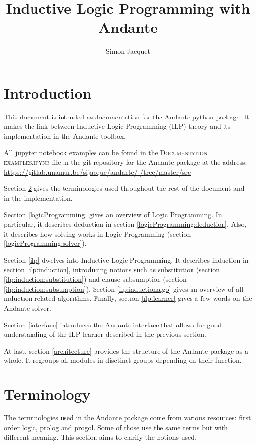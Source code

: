 \documentclass{article}
\title{Inductive Logic Programming with Andante}
\author{Simon Jacquet}
\begin{document}
\maketitle
\section{Introduction} \label{introduction}

This document is intended as documentation for the Andante python package. It 
makes the link between Inductive Logic Programming (ILP) theory and its 
implementation in the Andante toolbox.

All jupyter notebook examples can be found in the \textsc{Documentation
examples.ipynb} file in the git-repository for the Andante package at the
address: \url{https://gitlab.unamur.be/sijacque/andante/-/tree/master/src}

Section \ref{terminology} gives the terminologies used throughout the rest of 
the document and in the implementation.

Section \ref{logicProgramming} gives an overview of Logic Programming. In
particular, it describes deduction in section \ref{logicProgramming:deduction}.
Also, it describes how solving works in Logic Programming (section
\ref{logicProgramming:solver}).

Section \ref{ilp} dwelves into Inductive Logic Programming. It describes
induction in section \ref{ilp:induction}, introducing notions such as
substitution (section \ref{ilp:induction:substitution}) and clause subsumption
(section \ref{ilp:induction:subsumption}). Section \ref{ilp:inductionalgo}
gives an overview of all induction-related algorithms. Finally, section
\ref{ilp:learner} gives a few words on the Andante solver.

Section \ref{interface} introduces the Andante interface that allows for good 
understanding of the ILP learner described in the previous section.

At last, section \ref{architecture} provides the structure of the Andante
package as a whole. It regroups all modules in disctinct groups depending on
their function.

\newpage
\section{Terminology} \label{terminology}

The terminologies used in the Andante package come from various resources:
first order logic, prolog and progol. Some of those use the same terms but with
different meaning. This section aims to clarify the notions used.
\end{document}
